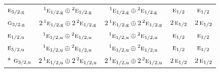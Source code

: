 \documentclass[10pt,a4paper]{article}
\numberwithin{equation}{section}
\newcommand{\irr}[1]{\text{\normalfont\scshape #1}}
\newcommand{\conjpair}[1]{{}^{#1}}
\newcommand{\ptag}[1]{\mathrm{#1}}
\begin{document}
{\begin{longtable}{@{}lcccc@{}}
$\irr{e}_{5/2,\ptag{g}}$ & $\conjpair{1}\irr{e}_{1/2,\ptag{g}}\oplus \conjpair{2}\irr{e}_{1/2,\ptag{g}}$ & $\conjpair{1}\irr{e}_{1/2,\ptag{g}}\oplus \conjpair{2}\irr{e}_{1/2,\ptag{g}}$ & $\irr{e}_{1/2}$ & $\irr{e}_{1/2}$\\
$\irr{g}_{3/2,\ptag{g}}$ & $2\,\conjpair{1}\irr{e}_{1/2,\ptag{g}}\oplus 2\,\conjpair{2}\irr{e}_{1/2,\ptag{g}}$ & $2\,\conjpair{1}\irr{e}_{1/2,\ptag{g}}\oplus 2\,\conjpair{2}\irr{e}_{1/2,\ptag{g}}$ & $2\,\irr{e}_{1/2}$ & $2\,\irr{e}_{1/2}$\\
$\irr{e}_{1/2,\ptag{u}}$ & $\conjpair{1}\irr{e}_{1/2,\ptag{u}}\oplus \conjpair{2}\irr{e}_{1/2,\ptag{u}}$ & $\conjpair{1}\irr{e}_{1/2,\ptag{u}}\oplus \conjpair{2}\irr{e}_{1/2,\ptag{u}}$ & $\irr{e}_{1/2}$ & $\irr{e}_{1/2}$\\
$\irr{e}_{5/2,\ptag{u}}$ & $\conjpair{1}\irr{e}_{1/2,\ptag{u}}\oplus \conjpair{2}\irr{e}_{1/2,\ptag{u}}$ & $\conjpair{1}\irr{e}_{1/2,\ptag{u}}\oplus \conjpair{2}\irr{e}_{1/2,\ptag{u}}$ & $\irr{e}_{1/2}$ & $\irr{e}_{1/2}$\\*
$\irr{g}_{3/2,\ptag{u}}$ & $2\,\conjpair{1}\irr{e}_{1/2,\ptag{u}}\oplus 2\,\conjpair{2}\irr{e}_{1/2,\ptag{u}}$ & $2\,\conjpair{1}\irr{e}_{1/2,\ptag{u}}\oplus 2\,\conjpair{2}\irr{e}_{1/2,\ptag{u}}$ & $2\,\irr{e}_{1/2}$ & $2\,\irr{e}_{1/2}$\\
\bottomrule\end{longtable}}
\end{document}
